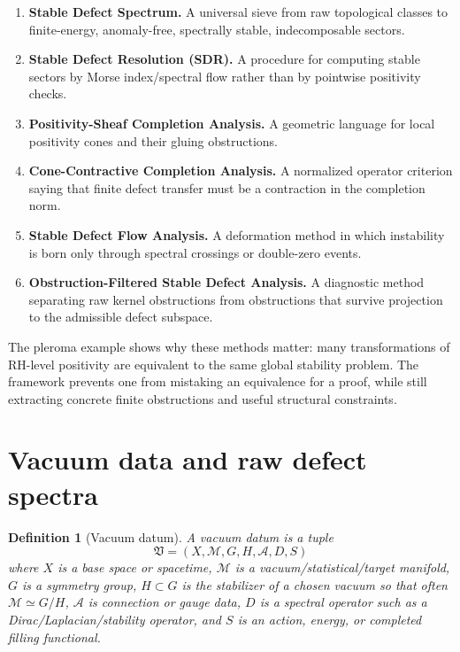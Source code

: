 \documentclass[11pt]{article}
\newtheorem{definition}[theorem]{Definition}
\newcommand{\V}{\mathfrak V}
\newcommand{\A}{\mathcal A}
\newcommand{\M}{\mathcal M}
\begin{document}
\begin{enumerate}[label=\textbf{P\arabic*.}, leftmargin=*]
    \item \textbf{Stable Defect Spectrum.} A universal sieve from raw topological classes to finite-energy, anomaly-free, spectrally stable, indecomposable sectors.
    \item \textbf{Stable Defect Resolution (SDR).} A procedure for computing stable sectors by Morse index/spectral flow rather than by pointwise positivity checks.
    \item \textbf{Positivity-Sheaf Completion Analysis.} A geometric language for local positivity cones and their gluing obstructions.
    \item \textbf{Cone-Contractive Completion Analysis.} A normalized operator criterion saying that finite defect transfer must be a contraction in the completion norm.
    \item \textbf{Stable Defect Flow Analysis.} A deformation method in which instability is born only through spectral crossings or double-zero events.
    \item \textbf{Obstruction-Filtered Stable Defect Analysis.} A diagnostic method separating raw kernel obstructions from obstructions that survive projection to the admissible defect subspace.
\end{enumerate}

The pleroma example shows why these methods matter: many transformations of RH-level positivity are equivalent to the same global stability problem. The framework prevents one from mistaking an equivalence for a proof, while still extracting concrete finite obstructions and useful structural constraints.

\section{Vacuum data and raw defect spectra}

\begin{definition}[Vacuum datum]
A vacuum datum is a tuple
\[
\boxed{
\V=(X,\M,G,H,\A,D,S)
}
\]
where $X$ is a base space or spacetime, $\M$ is a vacuum/statistical/target manifold, $G$ is a symmetry group, $H\subset G$ is the stabilizer of a chosen vacuum so that often $\M\simeq G/H$, $\A$ is connection or gauge data, $D$ is a spectral operator such as a Dirac/Laplacian/stability operator, and $S$ is an action, energy, or completed filling functional.
\end{definition}
\end{document}
